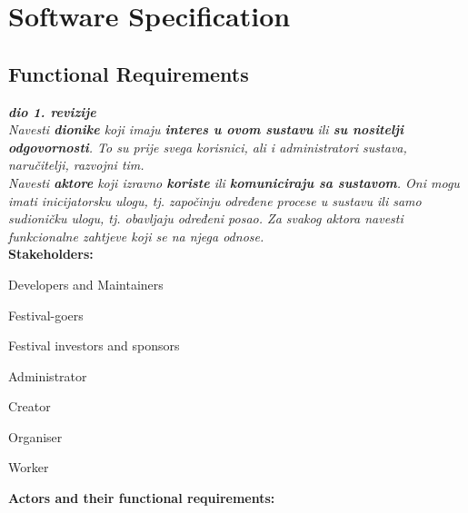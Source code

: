 \chapter{Software Specification}
		
	\section{Functional Requirements}
			
			\textbf{\textit{dio 1. revizije}}\\
			
			\textit{Navesti \textbf{dionike} koji imaju \textbf{interes u ovom sustavu} ili  \textbf{su nositelji odgovornosti}. To su prije svega korisnici, ali i administratori sustava, naručitelji, razvojni tim.}\\
				
			\textit{Navesti \textbf{aktore} koji izravno \textbf{koriste} ili \textbf{komuniciraju sa sustavom}. Oni mogu imati inicijatorsku ulogu, tj. započinju određene procese u sustavu ili samo sudioničku ulogu, tj. obavljaju određeni posao. Za svakog aktora navesti funkcionalne zahtjeve koji se na njega odnose.}\\
			
			\noindent \textbf{Stakeholders:}
			
			\begin{packed_enum}
				
				\item Developers and Maintainers
				\item Festival-goers
				\item Festival investors and sponsors
				\item Administrator			
				\item Creator
				\item Organiser
				\item Worker
				
			\end{packed_enum}
			
			\noindent \textbf{Actors and their functional requirements:}
			
